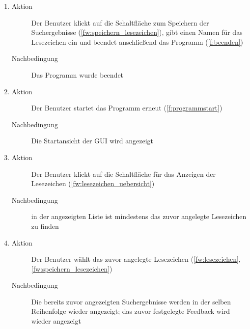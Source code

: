 \begin{enumerate} [label=\bfseries /TSW \arabic*0/, leftmargin=*]
\begin{enumerate}
\begin{description}
		\end{description}
		\item
		\begin{description}
			\item[Aktion] Der Benutzer klickt auf die Schaltfläche zum Speichern der Suchergebnisse (\ref{fw:speichern_lesezeichen}), gibt einen Namen für das Lesezeichen ein und beendet anschließend das Programm (\ref{f:beenden})
			\item[Nachbedingung] Das Programm wurde beendet
		\end{description}
		\item
		\begin{description}
			\item[Aktion] Der Benutzer startet das Programm erneut (\ref{f:programmstart})
			\item[Nachbedingung] Die Startansicht der GUI wird angezeigt
		\end{description}
		\item
		\begin{description}
			\item[Aktion] Der Benutzer klickt auf die Schaltfläche für das Anzeigen der Lesezeichen (\ref{fw:lesezeichen_uebersicht})
			\item[Nachbedingung] in der angezeigten Liste ist mindestens das zuvor angelegte Lesezeichen zu finden
		\end{description}
		\item
		\begin{description}
			\item[Aktion] Der Benutzer wählt das zuvor angelegte Lesezeichen (\ref{fw:lesezeichen}, \ref{fw:speichern_lesezeichen})
			\item[Nachbedingung] Die bereits zuvor angezeigten Suchergebnisse werden in der selben Reihenfolge wieder angezeigt; das zuvor festgelegte Feedback wird wieder angezeigt
		\end{description}
	\end{enumerate}


\end{enumerate}
